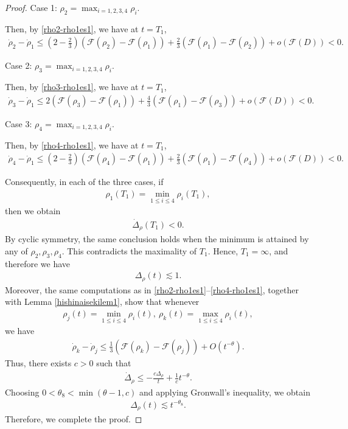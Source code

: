 \documentclass[10pt,a4paper]{amsart}
\numberwithin{equation}{section}
\begin{document}
\begin{proof}
Case 1: $\rho_2=\max_{i=1,2,3,4}\rho_i$.


Then, by \eqref{rho2-rho1es1}, we have at $t=T_1$,
\begin{align*}
\dot{\rho}_2-\dot{\rho}_1\leq \left(2-\frac{2}{3}\right)\left(\mathcal{F}(\rho_2)-\mathcal{F}(\rho_1)\right)+\frac{2}{3}\left(\mathcal{F}(\rho_1)-\mathcal{F}(\rho_2)\right)+o\left(\mathcal{F}(D)\right)<0.
\end{align*}


Case 2: $\rho_3=\max_{i=1,2,3,4}\rho_i$.


Then, by \eqref{rho3-rho1es1}, we have at $t=T_1$,
\begin{align*}
\dot{\rho}_3-\dot{\rho}_1\leq 2\left(\mathcal{F}(\rho_3)-\mathcal{F}(\rho_1)\right)+\frac{4}{3}\left(\mathcal{F}(\rho_1)-\mathcal{F}(\rho_3)\right)+o\left(\mathcal{F}(D)\right)<0.
\end{align*}


Case 3: $\rho_4=\max_{i=1,2,3,4}\rho_i$.


Then, by \eqref{rho4-rho1es1}, we have at $t=T_1$,
\begin{align*}
\dot{\rho}_4-\dot{\rho}_1\leq \left(2-\frac{2}{3}\right)\left(\mathcal{F}(\rho_4)-\mathcal{F}(\rho_1)\right)+\frac{2}{3}\left(\mathcal{F}(\rho_1)-\mathcal{F}(\rho_4)\right)+o\left(\mathcal{F}(D)\right)<0.
\end{align*}


Consequently, in each of the three cases, if
\begin{align*}
\rho_1(T_1)=\min_{1\leq i\leq4}\rho_i(T_1),
\end{align*}
then we obtain
\begin{align*}
\dot{\Delta}_{\rho}(T_1)<0.
\end{align*}
By cyclic symmetry, the same conclusion holds when the minimum is attained by any of $\rho_2,\rho_3,\rho_4$. This contradicts the maximality of $T_1$. Hence, $T_1=\infty$, and therefore we have
\begin{align*}
\Delta_{\rho}(t)\lesssim1.
\end{align*}
Moreover, the same computations as in \eqref{rho2-rho1es1}--\eqref{rho4-rho1es1}, together with Lemma \ref{hishinaisekilem1}, show that whenever
\begin{align*}
\rho_j(t)=\min_{1\leq i\leq4}\rho_i(t),\ \rho_k(t)=\max_{1\leq i\leq4}\rho_i(t),
\end{align*}
we have
\begin{align*}
\dot{\rho}_k-\dot{\rho}_j\leq\frac{1}{3}\left(\mathcal{F}(\rho_k)-\mathcal{F}(\rho_j)\right)+O\left(t^{-\theta}\right).
\end{align*}
Thus, there exists $c>0$ such that 
\begin{align*}
\dot{\Delta}_{\rho}\leq -\frac{c\Delta_{\rho}}{t}+\frac{1}{c}t^{-\theta}.
\end{align*}
Choosing $0<\theta_8<\min{(\theta-1,c)}$ and applying Gronwall's inequality, we obtain
\begin{align*}
\Delta_{\rho}(t)\lesssim t^{-\theta_8}.
\end{align*}
Therefore, we complete the proof.

\end{proof}
\end{document}
